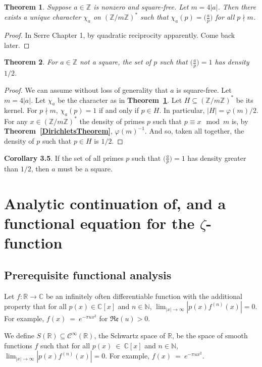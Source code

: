 \documentclass[12pt]{article}
\newcommand{\reals}{\mathbb{R}}
\newcommand{\nats}{\mathbb{N}}
\newcommand{\ints}{\mathbb{Z}}
\newcommand{\complex}{\mathbb{C}}
\newcommand{\intsmod}[1]{\ints / #1 \ints}
\newcommand{\tref}[1]{\textbf{Theorem~\ref{#1}}}
\newtheorem{thm}{Theorem}
\numberwithin{equation}{section}
\numberwithin{thm}{section}
\numberwithin{lemma}{section}
\numberwithin{cor}{section}
\begin{document}
\begin{thm}\label{CharacterExtensionOfLegendreSymbol}
  Suppose $a \in \ints$ is nonzero and square-free. Let $m = 4 |a|$. Then there exists a unique character $\chi_a$ on $(\intsmod{m})^*$ such that $\chi_a(p) = \big(\frac{a}{p}\big)$ for all $p \nmid m$.
\end{thm}
\begin{proof}
  In Serre Chapter 1, by quadratic reciprocity apparently. Come back later.
\end{proof}

\begin{thm}\label{PrimeSquaresHaveHalfDensity}
  For $a \in \ints$ not a square, the set of $p$ such that $\big(\frac{a}{p} \big) = 1$ has density $1/2$.
\end{thm}
\begin{proof}
  We can assume without loss of generality that $a$ is square-free. Let $m = 4 |a|$. Let $\chi_a$ be the character as in \tref{CharacterExtensionOfLegendreSymbol}. Let $H \subseteq (\intsmod{m})^*$ be its kernel. For $p \nmid m$, $\chi_a(p) = 1$ if and only if $p \in H$. In particular, $|H| = \varphi(m)/2$. For any $x \in (\intsmod{m})^*$ the density of primes $p$ such that $p \equiv x \mod m$ is, by \tref{DirichletsTheorem}, $\varphi(m)^{-1}$. And so, taken all together, the density of $p$ such that $p \in H$ is $1/2$.
\end{proof}

\textbf{Corollary 3.5}. If the set of all primes $p$ such that $\big( \frac{a}{p} \big) = 1$ has density greater than $1/2$, then $a$ must be a square.

\section{Analytic continuation of, and a functional equation for the $\zeta$-function}

\subsection{Prerequisite functional analysis}

Let $f: \reals \to \complex$ be an infinitely often differentiable function with the additional property that for all $p(x) \in \complex[x]$ and $n \in \nats$, $\lim_{|x| \to \infty} |p(x) f^{(n)}(x)| = 0$. For example, $f(x)~=~e^{-\pi u x^2}$ for $\mathfrak{Re}(u) > 0$.

We define $S(\reals) \subseteq \mathcal{C}^{\infty}(\reals)$, the Schwartz space of $\reals$, be the space of smooth functions $f$ such that for all $p(x)~\in~\complex[x]$ and $n \in \nats$, $\lim_{|x| \to \infty} |p(x)f^{(n)}(x)| = 0$. For example, $f(x)~=~e^{-\pi u x^2}$.
\end{document}
